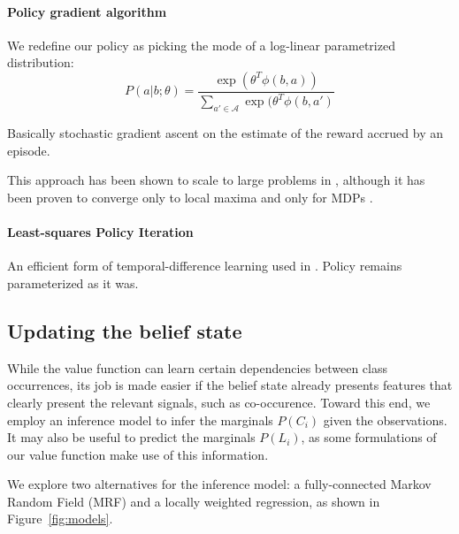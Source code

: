 \documentclass[runningheads]{llncs}
\begin{document}
\paragraph{Policy gradient algorithm}
We redefine our policy as picking the mode of a log-linear parametrized distribution:
\begin{equation}
P(a|b;\theta) = \frac{\exp(\theta^T \phi(b,a))}{\sum_{a' \in \mathcal{A}} \exp(\theta^T \phi(b,a')}
\end{equation}

Basically stochastic gradient ascent on the estimate of the reward accrued by an episode.

This approach has been shown to scale to large problems in \cite{Branavan2009}, although it has been proven to converge only to local maxima and only for MDPs \cite{Sutton2000}.


\paragraph{Least-squares Policy Iteration}
An efficient form of temporal-difference learning used in \cite{Kwok2004}.
Policy remains parameterized as it was.

\subsection{Updating the belief state}
While the value function can learn certain dependencies between class occurrences, its job is made easier if the belief state already presents features that clearly present the relevant signals, such as co-occurence.
Toward this end, we employ an inference model to infer the marginals $P(C_i)$ given the observations.
It may also be useful to predict the marginals $P(L_i)$, as some formulations of our value function make use of this information.

We explore two alternatives for the inference model: a fully-connected Markov Random Field (MRF) and a locally weighted regression, as shown in Figure~\ref{fig:models}.
\end{document}
